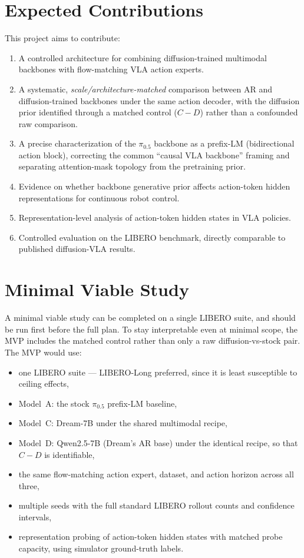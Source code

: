 \documentclass[11pt]{article}
\begin{document}
\section{Expected Contributions}

This project aims to contribute:

\begin{enumerate}
    \item A controlled architecture for combining diffusion-trained multimodal backbones with flow-matching VLA action experts.
    \item A systematic, \emph{scale/architecture-matched} comparison between AR and diffusion-trained backbones under the same action decoder, with the diffusion prior identified through a matched control ($C - D$) rather than a confounded raw comparison.
    \item A precise characterization of the $\pi_{0.5}$ backbone as a prefix-LM (bidirectional action block), correcting the common ``causal VLA backbone'' framing and separating attention-mask topology from the pretraining prior.
    \item Evidence on whether backbone generative prior affects action-token hidden representations for continuous robot control.
    \item Representation-level analysis of action-token hidden states in VLA policies.
    \item Controlled evaluation on the LIBERO benchmark, directly comparable to published diffusion-VLA results.
\end{enumerate}

\section{Minimal Viable Study}

A minimal viable study can be completed on a single LIBERO suite, and should be run first before the full plan. To stay interpretable even at minimal scope, the MVP includes the matched control rather than only a raw diffusion-vs-stock pair. The MVP would use:

\begin{itemize}
    \item one LIBERO suite --- LIBERO-Long preferred, since it is least susceptible to ceiling effects,
    \item Model~A: the stock $\pi_{0.5}$ prefix-LM baseline,
    \item Model~C: Dream-7B under the shared multimodal recipe,
    \item Model~D: Qwen2.5-7B (Dream's AR base) under the identical recipe, so that $C - D$ is identifiable,
    \item the same flow-matching action expert, dataset, and action horizon across all three,
    \item multiple seeds with the full standard LIBERO rollout counts and confidence intervals,
    \item representation probing of action-token hidden states with matched probe capacity, using simulator ground-truth labels.
\end{itemize}
\end{document}
